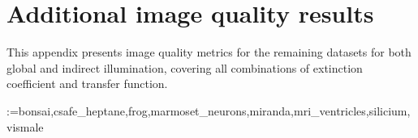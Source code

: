 \appendix
{}

\chapter{Additional image quality results}
\label{ch:quality}

This appendix presents image quality metrics for the remaining datasets for
both global and indirect illumination, covering all combinations of extinction
coefficient and transfer function.

\makeatletter
\newcommand{\qualitytables}[1]{%
    \@for\vol:=#1\do{%
        
        
    }%
}
\makeatother

\qualitytables{bonsai,csafe_heptane,frog,marmoset_neurons,miranda,mri_ventricles,silicium,vismale}